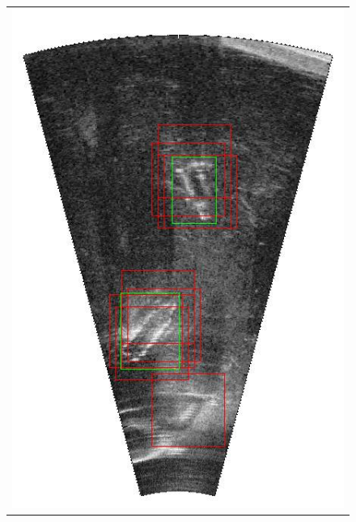 \begin{figure}[p]
{\begin{tabular}[b]{c}
		\includegraphics[height=0.22\textheight]{chapters/images/proposals/detections/nms-070-2016-02-11_035335-frame11602-topK10-proposals.jpg}\\

\end{tabular}}
\end{figure}
